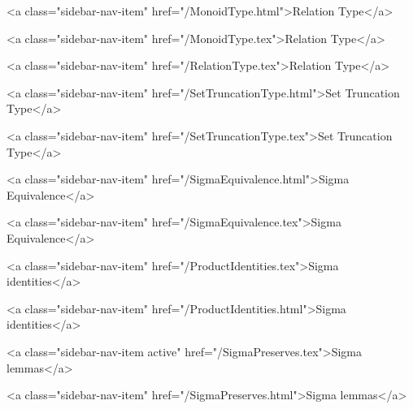       
    
      
        
          <a class="sidebar-nav-item" href="/MonoidType.html">Relation Type</a>
        
      
    
      
        
          <a class="sidebar-nav-item" href="/MonoidType.tex">Relation Type</a>
        
      
    
      
        
          <a class="sidebar-nav-item" href="/RelationType.tex">Relation Type</a>
        
      
    
      
        
          <a class="sidebar-nav-item" href="/SetTruncationType.html">Set Truncation Type</a>
        
      
    
      
        
          <a class="sidebar-nav-item" href="/SetTruncationType.tex">Set Truncation Type</a>
        
      
    
      
        
          <a class="sidebar-nav-item" href="/SigmaEquivalence.html">Sigma Equivalence</a>
        
      
    
      
        
          <a class="sidebar-nav-item" href="/SigmaEquivalence.tex">Sigma Equivalence</a>
        
      
    
      
        
          <a class="sidebar-nav-item" href="/ProductIdentities.tex">Sigma identities</a>
        
      
    
      
        
          <a class="sidebar-nav-item" href="/ProductIdentities.html">Sigma identities</a>
        
      
    
      
        
          <a class="sidebar-nav-item active" href="/SigmaPreserves.tex">Sigma lemmas</a>
        
      
    
      
        
          <a class="sidebar-nav-item" href="/SigmaPreserves.html">Sigma lemmas</a>
        
